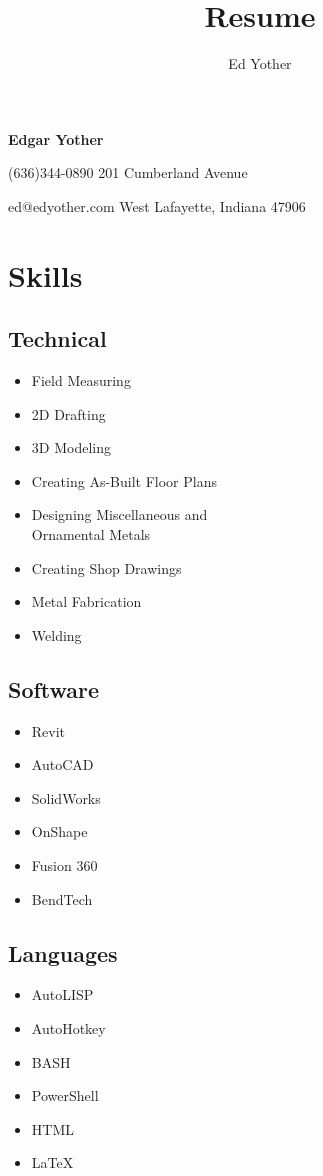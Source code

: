 \documentclass[9pt]{extarticle}
\title{Resume}
\author{Ed Yother}
\begin{document}
\titleformat{\section}{\large\bfseries}{\thesection}{1em}{\hrule}

\begin{huge}
\begin{center}
    \textbf{Edgar Yother}
\end{center}

(636)344-0890 \hfill 201 Cumberland Avenue 

ed@edyother.com \hfill West Lafayette, Indiana 47906 
\end{huge}

\section*{Skills}

\begin{multicols}{3}
\subsection*{Technical}
\begin{itemize}
    \item Field Measuring  
    \item 2D Drafting
    \item 3D Modeling
    \item Creating As-Built Floor Plans
    \item Designing Miscellaneous and \\
        Ornamental Metals 
    \item Creating Shop Drawings
    \item Metal Fabrication  
    \item Welding  
\end{itemize}
\columnbreak
\subsection*{Software}
\begin{itemize}
    \item Revit
    \item AutoCAD  
    \item SolidWorks  
    \item OnShape
    \item Fusion 360
    \item BendTech  
\end{itemize}
\columnbreak
\subsection*{Languages}
\begin{itemize}
    \item AutoLISP
    \item AutoHotkey
    \item BASH
    \item PowerShell
    \item HTML
    \item \LaTeX
\end{itemize}
\end{multicols}
\end{document}
